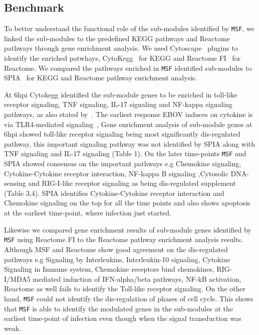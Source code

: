 \documentclass[twocolumn]{article}
\begin{document}
\subsection*{Benchmark} 

To better understand the functional role of the sub-modules identified by  \texttt{MSF}, we linked the  sub-modules to the predefined KEGG pathways and Reactome
pathways through gene enrichment analysis. We used Cytoscape~\cite{Cyto} plugins to identify the enriched patwhays, CytoKegg~\cite{Cytokegg} for KEGG and Reactome FI~\cite{Reactome} for Reactome. We compared the pathways enriched in \texttt{MSF} identified sub-modules to SPIA~\cite{Tarca} for KEGG and Reactome pathway enrichment analysis. 

At 6hpi Cytokegg identified the sub-module genes to be enriched in toll-like receptor signaling, TNF signaling, IL-17 signaling and NF-kappa signaling pathways, as also stated by~\cite{Olejnik}. The earliest response EBOV
induces on  cytokine is via TLR4-mediated signaling~\cite{Olejnik}, Gene enrichment analysis of sub-module genes at 6hpi showed toll-like receptor signaling being most significantly dis-regulated pathway, this important signaling pathway was not identified by SPIA along with TNF signaling and IL-17 signaling (Table 1). On the later time-points \texttt{MSF} and SPIA showed consensus on the important pathways e.g Chemokine signaling, Cytokine-Cytokine receptor interaction, NF-kappa B signaling ,Cytosolic DNA-sensing  and RIG-I-like receptor signaling as being dis-regulated supplement (Table 3,4). SPIA identifies Cytokine-Cytokine receptor interaction and Chemokine signaling on the top for all the time
points and also shows apoptosis at the earliest time-point, where infection
just started.

Likewise we compared gene enrichment results of sub-module genes identified by \texttt{MSF} using Reactome FI to the Reactome pathway enrichment analysis results. Although MSF and Reactome show good agreement on the dis-regulated pathways e.g Signaling by Interleukins, Interleukin-10 signaling, Cytokine Signaling in Immune system, Chemokine receptors bind chemokines, RIG-I/MDA5 mediated induction of IFN-alpha/beta pathways, NF-kB activation, Reactome as well fails to identify the Toll-like receptor signaling. On the other hand, \texttt{MSF} could not identify the dis-regulation of phases of cell cycle. This shows that \texttt{MSF} is able to identify the modulated genes in the sub-modules at the earliest time-point of infection even though when the signal transduction was weak.
\end{document}
